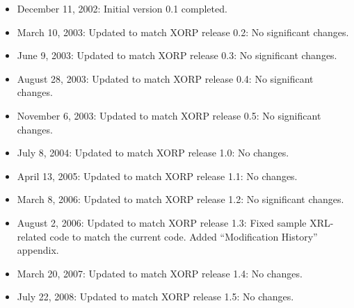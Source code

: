\documentclass[11pt]{article}
\begin{document}
\begin{itemize}

  \item December 11, 2002: Initial version 0.1 completed.

  \item March 10, 2003: Updated to match XORP release 0.2:
   No significant changes.

  \item June 9, 2003: Updated to match XORP release 0.3:
   No significant changes.

  \item August 28, 2003: Updated to match XORP release 0.4:
   No significant changes.

  \item November 6, 2003: Updated to match XORP release 0.5:
   No significant changes.

  \item July 8, 2004: Updated to match XORP release 1.0:
   No changes.

  \item April 13, 2005: Updated to match XORP release 1.1:
   No changes.

  \item March 8, 2006: Updated to match XORP release 1.2:
   No significant changes.

  \item August 2, 2006: Updated to match XORP release 1.3:
   Fixed sample XRL-related code to match the current code. Added
   ``Modification History'' appendix.

  \item March 20, 2007: Updated to match XORP release 1.4:
   No changes.

  \item July 22, 2008: Updated to match XORP release 1.5:
   No changes.

\end{itemize}




\end{document}
